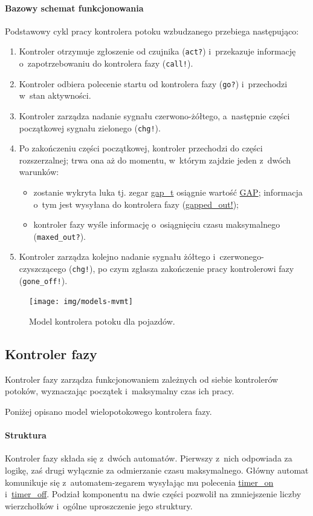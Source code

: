 \documentclass{pracamgr}
\theoremstyle{plain}
\begin{document}
\paragraph{Bazowy schemat funkcjonowania} Podstawowy cykl pracy
kontrolera potoku wzbudzanego przebiega następująco:
\begin{enumerate}
  \item Kontroler otrzymuje zgłoszenie od czujnika (\texttt{act?}) i~przekazuje
  informację o~zapotrzebowaniu do kontrolera fazy (\texttt{call!}).
  \item Kontroler odbiera polecenie startu od kontrolera fazy
  (\texttt{go?}) i~przechodzi w~stan aktywności.
  \item Kontroler zarządza nadanie sygnału czerwono-żółtego,
  a~następnie części początkowej sygnału zielonego (\texttt{chg!}).
  \item Po zakończeniu części początkowej, kontroler przechodzi do
  części rozszerzalnej; trwa ona aż do momentu, w~którym zajdzie jeden
  z~dwóch warunków:
  \begin{itemize}
    \item zostanie wykryta luka tj. zegar \url{gap_t} osiągnie wartość
    \url{GAP}; informacja o~tym jest wysyłana do kontrolera fazy
    (\url{gapped_out!});
    \item kontroler fazy wyśle informację o~osiągnięciu czasu
    maksymalnego (\texttt{maxed\_out?}).
  \end{itemize}
  \item Kontroler zarządza kolejno nadanie sygnału żółtego
  i~czerwonego-czyszczącego (\texttt{chg!}), po czym zgłasza zakończenie pracy
  kontrolerowi fazy (\texttt{gone\_off!}).
\end{enumerate}

\begin{figure}
  \centering
  \texttt{[image: img/models-mvmt]}
  \caption{Model kontrolera potoku dla pojazdów.}
  \label{img:mvmt-ctrl}
\end{figure}

\subsection{Kontroler fazy}
Kontroler fazy zarządza funkcjonowaniem zależnych od siebie
kontrolerów potoków, wyznaczając początek i~maksymalny czas ich pracy.

Poniżej opisano model wielopotokowego kontrolera fazy.
\paragraph{Struktura} Kontroler fazy składa się z~dwóch
automatów. Pierwszy z~nich odpowiada za logikę, zaś drugi wyłącznie za
odmierzanie czasu maksymalnego. Główny automat komunikuje się
z~automatem-zegarem wysyłając mu polecenia \url{timer_on}
i~\url{timer_off}. Podział komponentu na dwie części pozwolił na
zmniejszenie liczby wierzchołków i~ogólne uproszczenie jego struktury.
\end{document}
